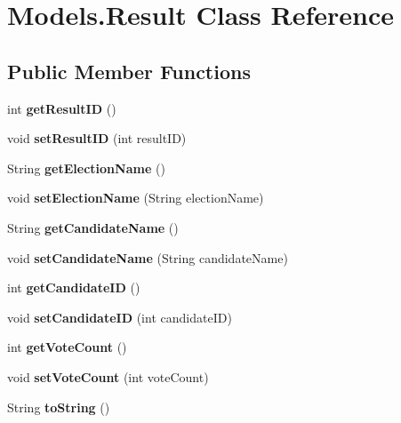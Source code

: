 \hypertarget{class_models_1_1_result}{}\section{Models.\+Result Class Reference}
\label{class_models_1_1_result}
\subsection*{Public Member Functions}
\begin{DoxyCompactItemize}
\item 
\mbox{\label{class_models_1_1_result_ad8cb726eae06511b324c7e752d9b3b43}} 
int {\bfseries get\+Result\+ID} ()
\item 
\mbox{\label{class_models_1_1_result_a5e66a88f7162e323b812f241dfd97b96}} 
void {\bfseries set\+Result\+ID} (int result\+ID)
\item 
\mbox{\label{class_models_1_1_result_ada8c653ef7d88416a3aac234c2fd991a}} 
String {\bfseries get\+Election\+Name} ()
\item 
\mbox{\label{class_models_1_1_result_a4bcb178b769f8bbb50246340dcd20063}} 
void {\bfseries set\+Election\+Name} (String election\+Name)
\item 
\mbox{\label{class_models_1_1_result_a66dac1eec07ba7404ded9a96da139608}} 
String {\bfseries get\+Candidate\+Name} ()
\item 
\mbox{\label{class_models_1_1_result_afdc6101072bd089afe8ed0877286bbb4}} 
void {\bfseries set\+Candidate\+Name} (String candidate\+Name)
\item 
\mbox{\label{class_models_1_1_result_a023966a999e9590de9026151a98f7f1d}} 
int {\bfseries get\+Candidate\+ID} ()
\item 
\mbox{\label{class_models_1_1_result_ab0b321b5f9a9dbfbd12409b1f2f230f4}} 
void {\bfseries set\+Candidate\+ID} (int candidate\+ID)
\item 
\mbox{\label{class_models_1_1_result_ad3c474170eebb7e0577a4790ade88dc6}} 
int {\bfseries get\+Vote\+Count} ()
\item 
\mbox{\label{class_models_1_1_result_a786d09b27a0c6c8d1f5fe95231e97012}} 
void {\bfseries set\+Vote\+Count} (int vote\+Count)
\item 
\mbox{\label{class_models_1_1_result_ad103831d31e9a595f59c526ddb831686}} 
String {\bfseries to\+String} ()
\end{DoxyCompactItemize}
